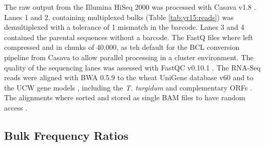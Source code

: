 The raw output from the Illumina HiSeq 2000 was processed with Casava v1.8 \citep{casavaBCL}. 
Lanes 1 and 2, containing multiplexed bulks (Table \ref{tab:yr15:reads}) was demultiplexed with a tolerance of 1 mismatch in the barcode. 
Lanes 3 and 4 contained the parental sequences without a barcode. 
The FastQ files where left compressed and in chunks of 40,000, as teh default for the BCL conversion pipeline from Casava to allow parallel processing in a cluster environment. 
The quality of the sequencing lanes was assessed with FastQC v0.10.1 \citep{fastqc}. 
The RNA-Seq reads were aligned with BWA 0.5.9 \citep{Li2009} to the wheat UniGene database v60 \citep{PontiusJUWagnerL2002} and to the UCW gene models \citep{Krasileva2013}, including the \textit{T. turgidum} and complementary ORFs \citep{MASWheat2013}.
The alignments where sorted and stored as single BAM files to have random access \citep{Li2009a}. 


\subsection{Bulk Frequency Ratios}
\label{yr15:sub:bfr}




